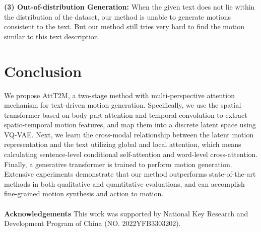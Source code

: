 \documentclass[10pt,twocolumn,letterpaper]{article}
\begin{document}
\textbf{(3) Out-of-distribution Generation:} When the given text does not lie within the distribution of the dataset, our method is unable to generate motions consistent to the text. But our method still tries very hard to find the motion similar to this text description. 

\section{Conclusion}
We propose AttT2M, a two-stage method with multi-perspective attention mechanism for text-driven motion generation. Specifically, we use the spatial transformer based on body-part attention and temporal convolution to extract spatio-temporal motion features, and map them into a discrete latent space using VQ-VAE. Next, we learn the cross-modal relationship between the latent motion representation and the text utilizing global and local attention, which means calculating sentence-level conditional self-attention and word-level cross-attention. Finally, a generative transformer is trained to perform motion generation. Extensive experiments demonstrate that our method outperforms state-of-the-art methods in both qualitative and quantitative evaluations, and can accomplish fine-grained motion synthesis and action to motion.
\\
\\
\hspace{-0.5cm}\textbf{\large{Acknowledgements}} 
This work was supported by National Key Research and Development Program of China (NO. 2022YFB3303202).

\newpage


{\small


}
\end{document}
